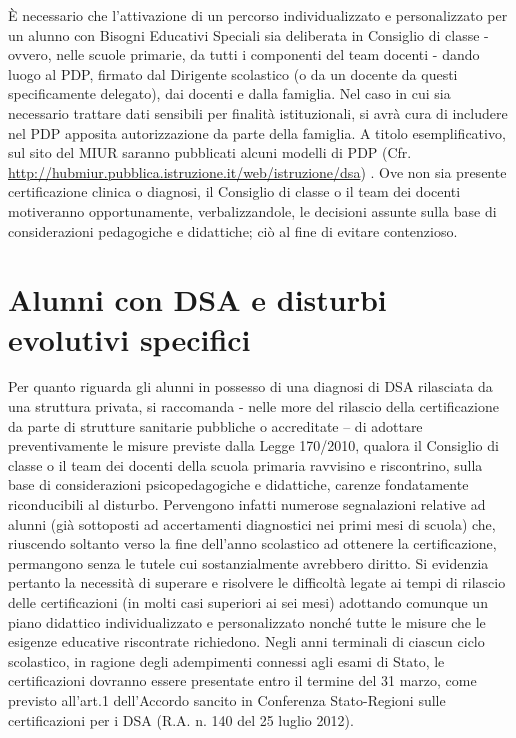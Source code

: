 È necessario che l'attivazione di un percorso individualizzato e personalizzato per un alunno
con Bisogni Educativi Speciali sia deliberata in Consiglio di classe - ovvero, nelle scuole primarie,
da tutti i componenti del team docenti - dando luogo al PDP, firmato dal Dirigente scolastico (o da
un docente da questi specificamente delegato), dai docenti e dalla famiglia. Nel caso in cui sia
necessario trattare dati sensibili per finalità istituzionali, si avrà cura di includere nel PDP apposita
autorizzazione da parte della famiglia.
A titolo esemplificativo, sul sito del MIUR saranno pubblicati alcuni modelli di PDP (Cfr.
\url{http://hubmiur.pubblica.istruzione.it/web/istruzione/dsa}) .
Ove non sia presente certificazione clinica o diagnosi, il Consiglio di classe o il team dei docenti
motiveranno opportunamente, verbalizzandole, le decisioni assunte sulla base di considerazioni
pedagogiche e didattiche; ciò al fine di evitare contenzioso.
\section*{Alunni con DSA e disturbi evolutivi specifici}
Per quanto riguarda gli alunni in possesso di una diagnosi di DSA rilasciata da una struttura
privata, si raccomanda - nelle more del rilascio della certificazione da parte di strutture sanitarie
pubbliche o accreditate – di adottare preventivamente le misure previste dalla Legge 170/2010,
qualora il Consiglio di classe o il team dei docenti della scuola primaria ravvisino e riscontrino, sulla  base di considerazioni psicopedagogiche e didattiche, carenze fondatamente riconducibili al disturbo.
Pervengono infatti numerose segnalazioni relative ad alunni (già sottoposti ad accertamenti
diagnostici nei primi mesi di scuola) che, riuscendo soltanto verso la fine dell'anno scolastico ad
ottenere la certificazione, permangono senza le tutele cui sostanzialmente avrebbero diritto. Si
evidenzia pertanto la necessità di superare e risolvere le difficoltà legate ai tempi di rilascio delle
certificazioni (in molti casi superiori ai sei mesi) adottando comunque un piano didattico
individualizzato e personalizzato nonché tutte le misure che le esigenze educative riscontrate
richiedono. Negli anni terminali di ciascun ciclo scolastico, in ragione degli adempimenti connessi
agli esami di Stato, le certificazioni dovranno essere presentate entro il termine del 31 marzo, come
previsto all'art.1 dell'Accordo sancito in Conferenza Stato-Regioni sulle certificazioni per i DSA
(R.A. n. 140 del 25 luglio 2012).
